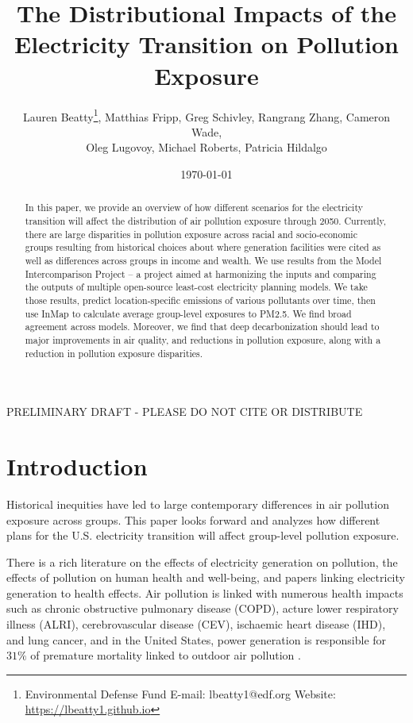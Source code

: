 \documentclass[a4paper]{article}
\title{The Distributional Impacts of the Electricity Transition on Pollution Exposure}
\author{Lauren Beatty\thanks{Environmental Defense Fund  \hspace{.5cm} E-mail: lbeatty1@edf.org \hspace{.5cm}Website: \href{https://lbeatty1.github.io}{https://lbeatty1.github.io}}, 
Matthias Fripp, 
Greg Schivley, 
Rangrang Zhang, 
Cameron Wade, \\ 
Oleg Lugovoy, 
Michael Roberts, 
Patricia Hildalgo}
\date{\today}
\theoremstyle{definition}
\theoremstyle{plain}
\begin{document}
\maketitle
\begin{center}
    PRELIMINARY DRAFT - PLEASE DO NOT CITE OR DISTRIBUTE
\end{center}

\begin{abstract}
    In this paper, we provide an overview of how different scenarios for the electricity transition will affect the distribution of air pollution exposure through 2050.  Currently, there are large disparities in pollution exposure across racial and socio-economic groups resulting from historical choices about where generation facilities were cited as well as differences across groups in income and wealth. We use results from the Model Intercomparison Project -- a project aimed at harmonizing the inputs and comparing the outputs of multiple open-source least-cost electricity planning models.  We take those results, predict location-specific emissions of various pollutants over time, then use InMap to calculate average group-level exposures to PM2.5.  We find broad agreement across models.  Moreover, we find that deep decarbonization should lead to major improvements in air quality, and reductions in pollution exposure, along with a reduction in pollution exposure disparities.
\end{abstract}

\newpage
\section{Introduction}
Historical inequities have led to large contemporary differences in air pollution exposure across groups.  This paper looks forward and analyzes how different plans for the U.S. electricity transition will affect group-level pollution exposure. 


There is a rich literature on the effects of electricity generation on pollution, the effects of pollution on human health and well-being, and papers linking electricity generation to health effects.  Air pollution is linked with numerous health impacts such as chronic obstructive pulmonary disease (COPD), acture lower respiratory illness (ALRI), cerebrovascular disease (CEV), ischaemic heart disease (IHD), and lung cancer, and in the United States, power generation is responsible for $31\%$ of premature mortality linked to outdoor air pollution \citep{Lelieveld2015TheScale}.
\end{document}
